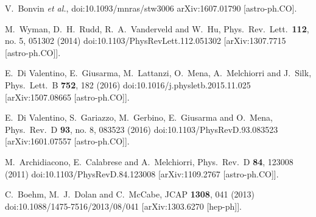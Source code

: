 \documentclass[aps,prd,a4paper,twocolumn,amsmath,showpacs,superscriptaddress,nofootinbib,preprintnumbers]{revtex4-1}
\begin{document}
\begin{thebibliography}{99}
  V.~Bonvin {\it et al.},
  doi:10.1093/mnras/stw3006
  arXiv:1607.01790 [astro-ph.CO].

  M.~Wyman, D.~H.~Rudd, R.~A.~Vanderveld and W.~Hu,
  Phys.\ Rev.\ Lett.\  {\bf 112}, no. 5, 051302 (2014)
  doi:10.1103/PhysRevLett.112.051302
  [arXiv:1307.7715 [astro-ph.CO]].
  
  
  E.~Di Valentino, E.~Giusarma, M.~Lattanzi, O.~Mena, A.~Melchiorri and J.~Silk,
  Phys.\ Lett.\ B {\bf 752}, 182 (2016)
  doi:10.1016/j.physletb.2015.11.025
  [arXiv:1507.08665 [astro-ph.CO]].

  E.~Di Valentino, S.~Gariazzo, M.~Gerbino, E.~Giusarma and O.~Mena,
  Phys.\ Rev.\ D {\bf 93}, no. 8, 083523 (2016)
  doi:10.1103/PhysRevD.93.083523
  [arXiv:1601.07557 [astro-ph.CO]].
  
  M.~Archidiacono, E.~Calabrese and A.~Melchiorri,
  Phys.\ Rev.\ D {\bf 84}, 123008 (2011)
  doi:10.1103/PhysRevD.84.123008
  [arXiv:1109.2767 [astro-ph.CO]].
 
 
  C.~Boehm, M.~J.~Dolan and C.~McCabe,
  JCAP {\bf 1308}, 041 (2013)
  doi:10.1088/1475-7516/2013/08/041
  [arXiv:1303.6270 [hep-ph]].
  

\end{thebibliography}
\end{document}
